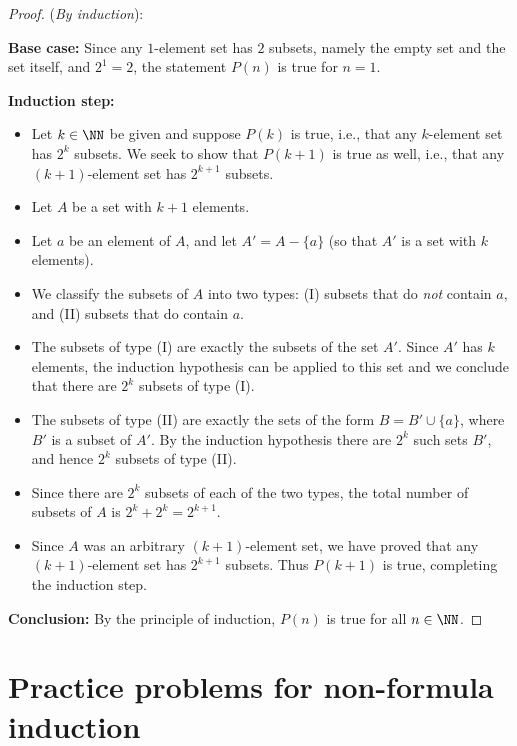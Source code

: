 \begin{proof}(\emph{By induction}):

\textbf{Base case:} Since any $1$-element set has $2$
subsets, namely the empty set and the set itself,
and $2^1=2$, the statement $P(n)$ is true for $n=1$.

\textbf{Induction step:} 
\begin{itemize}
\item 
Let $k\in\NN$ be given and suppose 
$P(k)$ is true, i.e., that any $k$-element set has $2^k$ subsets.
We seek to show that $P(k+1)$  is true as well,
i.e., that any $(k+1)$-element set has $2^{k+1}$ subsets.

\item 
Let $A$ be a set with $k+1$ elements.  

\item 
Let $a$ be an element of $A$, and let $A'=A-\{a\}$ (so that   
$A'$ is a set with $k$ elements).

\item 
We classify the subsets of $A$ into two types: (I) subsets that do
\emph{not} contain $a$, and (II) subsets that do contain $a$.

\item 
The subsets of type (I) are exactly the subsets of the set
$A'$. Since $A'$ has $k$ elements, the induction
hypothesis can be applied to this set and we conclude that there are $2^k$
subsets of type (I).

\item 
The subsets of type (II) are exactly the sets of the form $B=B'\cup
\{a\}$, where $B'$ is a subset of $A'$.
By the induction hypothesis there are $2^k$ such sets $B'$, and hence
$2^k$ subsets of type (II).

\item 
Since there are $2^k$ subsets of each of the two types, the total number
of subsets of  $A$ is $2^k+2^k=2^{k+1}$. 

\item 
Since $A$ was an arbitrary $(k+1)$-element set, we have proved that any
$(k+1)$-element set has $2^{k+1}$ subsets.
Thus $P(k+1)$ is true, completing the induction step. 
\end{itemize}

\textbf{Conclusion:} By the principle of induction, 
$P(n)$  is true for all $n\in\NN$.
\end{proof}

\section{Practice problems for non-formula induction}
\label{sec:Induction:PracticeNonFormulaInduction}


